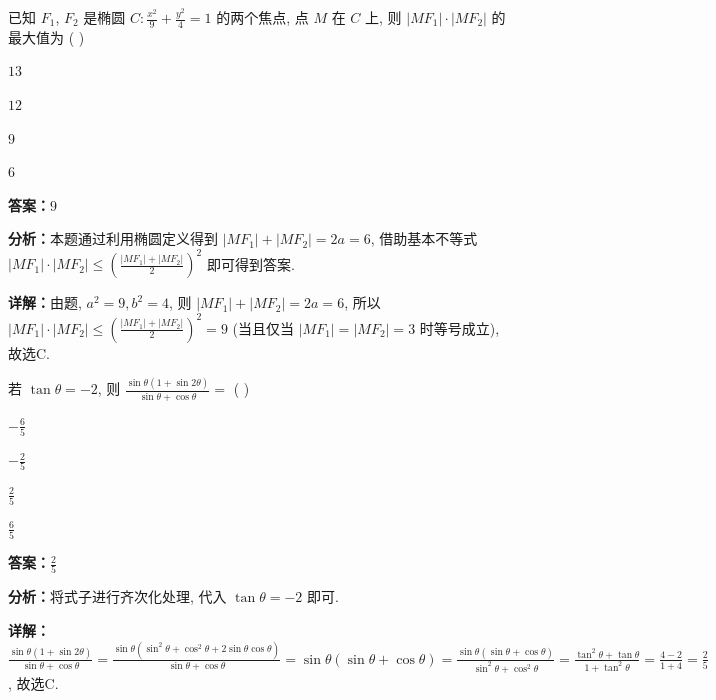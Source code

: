 \begin{question}[points=5]
已知 $F_1$, $F_2$ 是椭圆 $C: \frac{x^2}{9} + \frac{y^2}{4} = 1$ 的两个焦点, 点 $M$ 在 $C$ 上, 则 $|MF_1| \cdot |MF_2|$ 的最大值为 ( )
\begin{choices}
  \item $13$
  \item $12$
  \item $9$
  \item $6$
\end{choices}
\begin{solution}
\textbf{答案：}$9$

\textbf{分析：}本题通过利用椭圆定义得到 $|MF_1| + |MF_2| = 2a = 6$, 借助基本不等式 $|MF_1| \cdot |MF_2| \leq \left(\frac{|MF_1| + |MF_2|}{2}\right)^2$ 即可得到答案.

\textbf{详解：}由题, $a^2 = 9, b^2 = 4$, 则 $|MF_1| + |MF_2| = 2a = 6$, 所以 $|MF_1| \cdot |MF_2| \leq \left(\frac{|MF_1| + |MF_2|}{2}\right)^2 = 9$ (当且仅当 $|MF_1| = |MF_2| = 3$ 时等号成立), 故选C.
\end{solution}
\end{question}

\begin{question}[points=5]
若 $\tan\theta = -2$, 则 $\frac{\sin\theta(1 + \sin2\theta)}{\sin\theta + \cos\theta} =$ ( )
\begin{choices}
  \item $-\frac{6}{5}$
  \item $-\frac{2}{5}$
  \item $\frac{2}{5}$
  \item $\frac{6}{5}$
\end{choices}
\begin{solution}
\textbf{答案：}$\frac{2}{5}$

\textbf{分析：}将式子进行齐次化处理, 代入 $\tan\theta = -2$ 即可.

\textbf{详解：}$\frac{\sin\theta(1 + \sin2\theta)}{\sin\theta + \cos\theta} = \frac{\sin\theta(\sin^2\theta + \cos^2\theta + 2\sin\theta\cos\theta)}{\sin\theta + \cos\theta} = \sin\theta(\sin\theta + \cos\theta) = \frac{\sin\theta(\sin\theta + \cos\theta)}{\sin^2\theta + \cos^2\theta} = \frac{\tan^2\theta + \tan\theta}{1 + \tan^2\theta} = \frac{4 - 2}{1 + 4} = \frac{2}{5}$, 故选C.
\end{solution}
\end{question}

